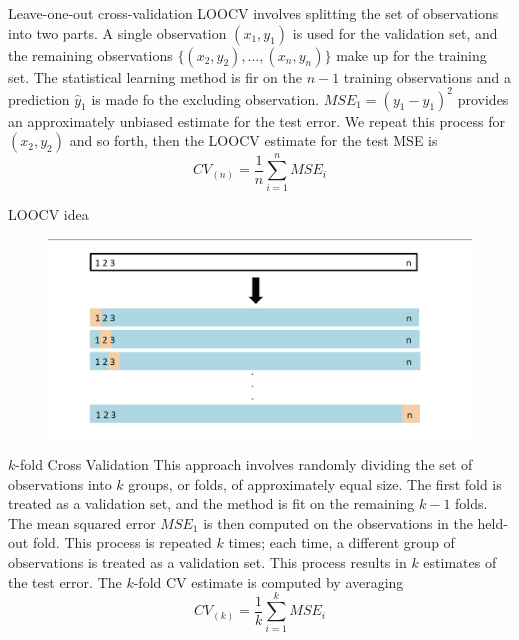\documentclass{beamer}
\begin{document}
\begin{frame}{Leave-one-out cross-validation}
	LOOCV  involves splitting the set of observations into two parts. A single observation $(x_1,y_1)$ is used for the validation set, and the remaining observations $\{(x_2,y_2), \ldots, (x_n,y_n)\}$  make up for the training set. The statistical learning method is fir on the $n-1$ training observations and a prediction $\hat{y}_1$ is made fo the excluding observation. $MSE_1= (y_1-\hat{y}_1)^2$ provides an approximately unbiased estimate for the test error. 	
	We repeat this process for $(x_2,y_2)$ and so forth, then the LOOCV estimate for the test MSE is 
	\begin{equation*}
		CV_{(n)}=\frac{1}{n} \sum_{i=1}^n MSE_i
	\end{equation*}
\end{frame}

\begin{frame}{LOOCV idea}
	\begin{figure}
		\centering
		\includegraphics[scale=0.35]{../../Figures/fig_loocv.png}
	\end{figure}	
\end{frame}


\begin{frame}{$k$-fold Cross Validation}
	This approach involves randomly dividing the set of observations into $k$ groups, or folds, of approximately equal size. The first fold is treated as a validation set, and the method is fit on the remaining $k-1$ folds. The mean squared error $MSE_1$ is then computed on the observations in the held-out fold. This process is repeated $k$ times; each time, a different group of observations is treated as a validation set. This process results in $k$ estimates of the test error. The $k$-fold CV estimate is computed by averaging 
	\begin{equation*}
		CV_{(k)}=\frac 1k \sum_{i=1}^k MSE_i
	\end{equation*}
\end{frame}
\end{document}
